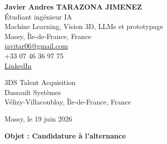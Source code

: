 \documentclass[10pt,a4paper]{article}
\begin{document}
\begin{minipage}[t]{0.48\textwidth}
\textbf{\large Javier Andres TARAZONA JIMENEZ}\\
Étudiant ingénieur IA \\
Machine Learning, Vision 3D, LLMs et prototypage \\
Massy, Île-de-France, France\\
\href{mailto:javitar06@gmail.com}{javitar06@gmail.com}\\
+33 07 46 36 97 75\\
\href{https://www.linkedin.com/in/javier-andres-tarazona-jimenez-84b489222/}{LinkedIn}
\end{minipage}
\hfill
\begin{minipage}[t]{0.42\textwidth}
\raggedleft
3DS Talent Acquisition\\
Dassault Systèmes\\
Vélizy-Villacoublay, Île-de-France, France\\
\end{minipage}

\vspace{1.1cm}

\raggedleft
Massy, le 19 juin 2026

\vspace{0.7cm}

\raggedright
\textbf{Objet : Candidature à l'alternance}

\vspace{0.5cm}
\end{document}
